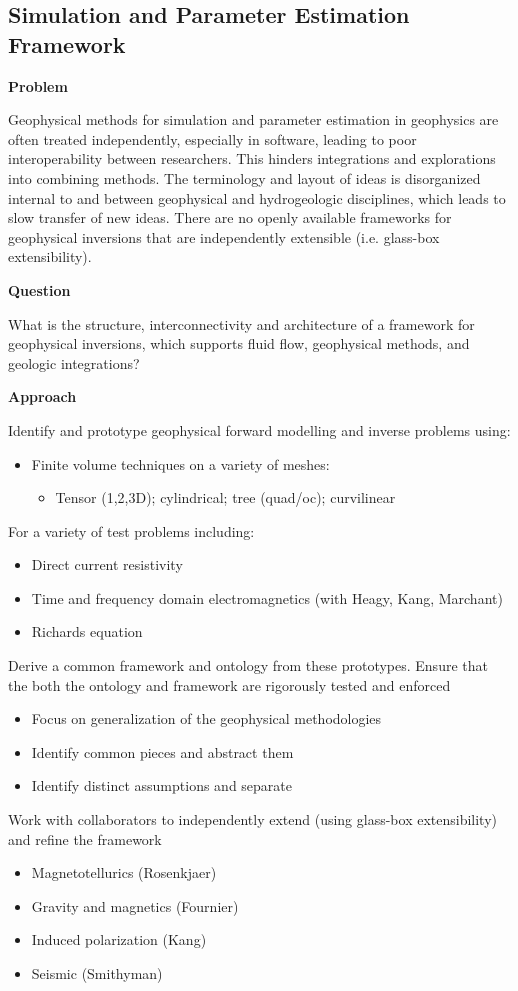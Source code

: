 \documentclass[11pt]{article}
\begin{document}
\subsection{Simulation and Parameter Estimation Framework}

\noindent
{\bf Problem}

\noindent
Geophysical methods for simulation and parameter estimation in geophysics are often treated independently, especially in software, leading to poor interoperability between researchers. This hinders integrations and explorations into combining methods. The terminology and layout of ideas is disorganized internal to and between geophysical and hydrogeologic disciplines, which leads to slow transfer of new ideas. There are no openly available frameworks for geophysical inversions that are independently extensible (i.e. glass-box extensibility).

\noindent
{\bf Question}

\noindent
What is the structure, interconnectivity and architecture of a framework for geophysical inversions, which supports fluid flow, geophysical methods, and geologic integrations?

\noindent
{\bf Approach}

\noindent
Identify and prototype geophysical forward modelling and inverse problems using:
\begin{itemize}
    \item Finite volume techniques on a variety of meshes:
    \begin{itemize}
        \item Tensor (1,2,3D); cylindrical; tree (quad/oc); curvilinear
    \end{itemize}
\end{itemize}
For a variety of test problems including:
\begin{itemize}
    \item Direct current resistivity
    \item Time and frequency domain electromagnetics (with Heagy, Kang, Marchant)
    \item Richards equation
\end{itemize}
Derive a common framework and ontology from these prototypes. Ensure that the both the ontology and framework are rigorously tested and enforced
\begin{itemize}
    \item Focus on generalization of the geophysical methodologies
    \item Identify common pieces and abstract them
    \item Identify distinct assumptions and separate
\end{itemize}
Work with collaborators to independently extend (using glass-box extensibility) and refine the framework
\begin{itemize}
    \item Magnetotellurics (Rosenkjaer)
    \item Gravity and magnetics (Fournier)
    \item Induced polarization (Kang)
    \item Seismic (Smithyman)
\end{itemize}
\end{document}
